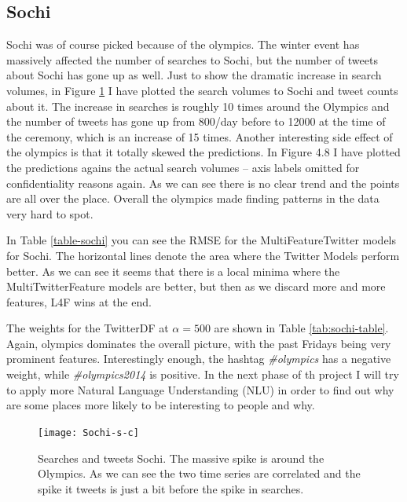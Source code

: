 \documentclass[minf,twoside,singlespacing,parskip,frontabs]{infthesis}
\begin{document}
\newpage
\subsection{Sochi}


Sochi was of course picked because of the olympics. The winter event has massively affected the number of searches to Sochi,  but the number of tweets about Sochi has gone up as well.  Just to show the dramatic increase in search volumes, in Figure \ref{sochi-c-s} I have plotted the search volumes to Sochi and tweet counts about it. The increase in searches is roughly 10 times around the Olympics and the number of tweets has gone up from 800/day before to 12000 at the time of the ceremony, which is an increase of 15 times. Another interesting side effect of the olympics is that it totally skewed the predictions. In Figure 4.8 I have plotted the predictions agains the actual search volumes -- axis labels omitted for confidentiality reasons again. As we can see there is no clear trend and the points are all over the place. Overall the olympics made finding patterns in the data very hard to spot. 


In Table \ref{table-sochi} you can see the RMSE for the MultiFeatureTwitter models for Sochi. The horizontal lines denote the area where the Twitter Models perform better. As we can see it seems that there is a local minima where the MultiTwitterFeature models are better, but then as we discard more and more features, L4F wins at the end. 

The weights for the TwitterDF at $\alpha=500$ are shown in Table \ref{tab:sochi-table}. Again, olympics dominates the overall picture, with the past Fridays being very prominent features. Interestingly enough, the hashtag \textit{\#olympics} has a negative weight, while \textit{\#olympics2014} is positive. In the next phase of th project I will try to apply more Natural Language Understanding (NLU) in order to find out why are some places more likely to be interesting to people and why. 




\begin{figure}[p!]
\begin{center}
\texttt{[image: Sochi-s-c]}
\end{center}
\caption{Searches and tweets Sochi. The massive spike is around the Olympics. As we can see the two time series are correlated and the spike it tweets is just a bit before the spike in searches.}
\label{sochi-c-s}
\end{figure}
\end{document}
